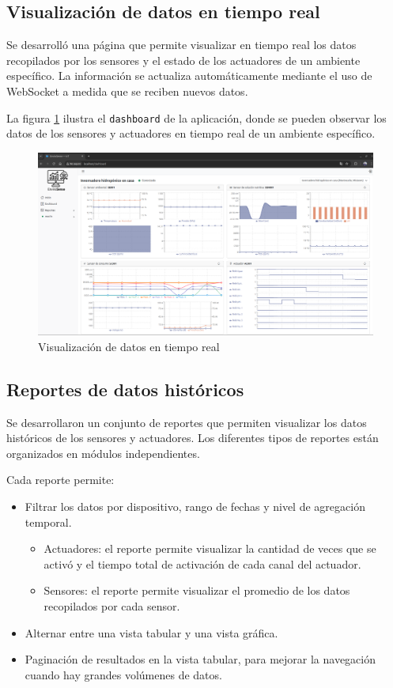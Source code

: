 \subsection{Visualización de datos en tiempo real}

Se desarrolló una página que permite visualizar en tiempo real los datos
recopilados por los sensores y el estado de los actuadores de un ambiente
específico. La información se actualiza automáticamente mediante el uso de
WebSocket a medida que se reciben nuevos datos.

La figura \ref{fig:dashboard} ilustra el \texttt{dashboard} de la aplicación,
donde se pueden observar los datos de los sensores y actuadores en tiempo real
de un ambiente específico.

\begin{figure}[H]
    \centering
    \includegraphics[width=\textwidth]{./Images/27_dashboard.png}
    \caption{Visualización de datos en tiempo real}
    \label{fig:dashboard}
\end{figure}

\subsection{Reportes de datos históricos}

Se desarrollaron un conjunto de reportes que permiten visualizar los datos
históricos de los sensores y actuadores. Los diferentes tipos de reportes están
organizados en módulos independientes.

Cada reporte permite:
\begin{itemize}
    \item Filtrar los datos por dispositivo, rango de fechas y nivel de agregación
          temporal.
          \begin{itemize}
              \item Actuadores: el reporte permite visualizar la cantidad de veces que se activó y
                    el tiempo total de activación de cada canal del actuador.
              \item Sensores: el reporte permite visualizar el promedio de los datos recopilados
                    por cada sensor.
          \end{itemize}
    \item Alternar entre una vista tabular y una vista gráfica.
    \item Paginación de resultados en la vista tabular, para mejorar la navegación cuando
          hay grandes volúmenes de datos.
\end{itemize}

